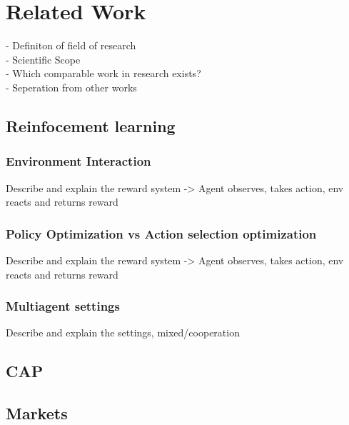 %
%
\chapter{Related Work}\label{sec:RelatedWork}
- Definiton of field of research \\
- Scientific Scope \\
- Which comparable work in research exists? \\
- Seperation from other works

\section{Reinfocement learning}

\subsection{Environment Interaction}
Describe and explain the reward system -> Agent observes, takes action,
env reacts and returns reward

\subsection{Policy Optimization vs Action selection optimization}
Describe and explain the reward system -> Agent observes, takes action,
env reacts and returns reward

\subsection{Multiagent settings}
Describe and explain the settings, mixed/cooperation

\section{CAP}

\section{Markets}

